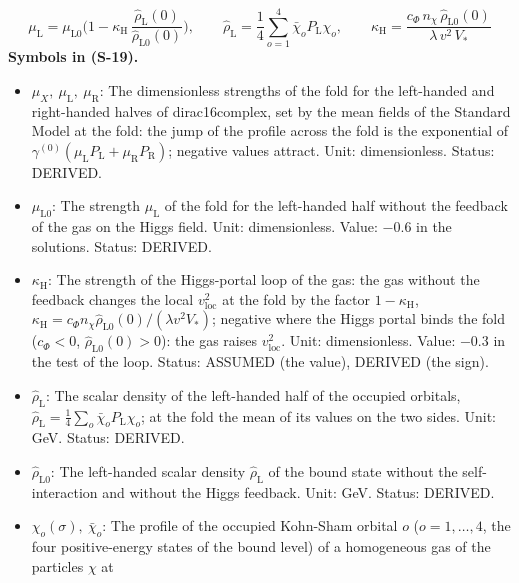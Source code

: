 \documentclass[
  10pt,
]{article}
\providecommand{\tightlist}{%
  \setlength{\itemsep}{0pt}\setlength{\parskip}{0pt}}
\begin{document}
\[
\mu_{\mathrm{L}} = \mu_{\mathrm{L}0}\Big(1 - \kappa_{\mathrm{H}}\,\frac{\hat\rho_{\mathrm{L}}(0)}{\hat\rho_{\mathrm{L}0}(0)}\Big),\qquad
\hat\rho_{\mathrm{L}} = \frac14\sum_{o=1}^{4}\bar\chi_oP_{\mathrm{L}}\chi_o,\qquad
\kappa_{\mathrm{H}} = \frac{c_\Phi\,n_\chi\,\hat\rho_{\mathrm{L}0}(0)}{\lambda\,v^2\,V_*} \tag{S-19}
\] \textbf{Symbols in (S-19).}

\begin{itemize}
\tightlist
\item
  \(\mu_X,\ \mu_{\mathrm{L}},\ \mu_{\mathrm{R}}\): The dimensionless
  strengths of the fold for the left-handed and right-handed halves of
  dirac16complex, set by the mean fields of the Standard Model at the
  fold: the jump of the profile across the fold is the exponential of
  \(\gamma^{(0)}(\mu_{\mathrm{L}}P_{\mathrm{L}} + \mu_{\mathrm{R}}P_{\mathrm{R}})\);
  negative values attract. Unit: dimensionless. Status: DERIVED.
\item
  \(\mu_{\mathrm{L}0}\): The strength \(\mu_{\mathrm{L}}\) of the fold
  for the left-handed half without the feedback of the gas on the Higgs
  field. Unit: dimensionless. Value: \(-0.6\) in the solutions. Status:
  DERIVED.
\item
  \(\kappa_{\mathrm{H}}\): The strength of the Higgs-portal loop of the
  gas: the gas without the feedback changes the local
  \(v_{\mathrm{loc}}^2\) at the fold by the factor
  \(1 - \kappa_{\mathrm{H}}\),
  \(\kappa_{\mathrm{H}} = c_\Phi n_\chi\hat\rho_{\mathrm{L}0}(0)/(\lambda v^2V_*)\);
  negative where the Higgs portal binds the fold (\(c_\Phi < 0\),
  \(\hat\rho_{\mathrm{L}0}(0) > 0\)): the gas raises
  \(v_{\mathrm{loc}}^2\). Unit: dimensionless. Value: \(-0.3\) in the
  test of the loop. Status: ASSUMED (the value), DERIVED (the sign).
\item
  \(\hat\rho_{\mathrm{L}}\): The scalar density of the left-handed half
  of the occupied orbitals,
  \(\hat\rho_{\mathrm{L}} = \frac14\sum_o\bar\chi_oP_{\mathrm{L}}\chi_o\);
  at the fold the mean of its values on the two sides. Unit: GeV.
  Status: DERIVED.
\item
  \(\hat\rho_{\mathrm{L}0}\): The left-handed scalar density
  \(\hat\rho_{\mathrm{L}}\) of the bound state without the
  self-interaction and without the Higgs feedback. Unit: GeV. Status:
  DERIVED.
\item
  \(\chi_o(\sigma),\ \bar\chi_o\): The profile of the occupied Kohn-Sham
  orbital \(o\) (\(o = 1, \dots, 4\), the four positive-energy states of
  the bound level) of a homogeneous gas of the particles \(\chi\) at

\end{itemize}
\end{document}
